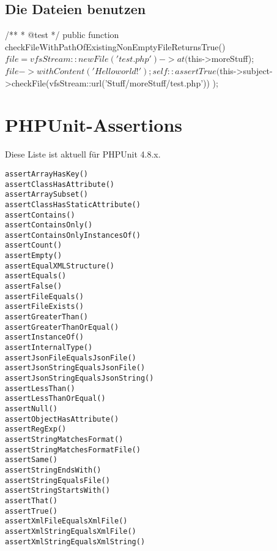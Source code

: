 \documentclass[a4paper,10pt]{scrartcl}
\begin{document}
\subsection{Die Dateien benutzen}
\begin{phpcode}
/**
 * @test
 */
public function checkFileWithPathOfExistingNonEmptyFileReturnsTrue() {
  $file = vfsStream::newFile('test.php')->at($this->moreStuff);
  $file->withContent('Hello world!');

  self::assertTrue(
    $this->subject->checkFile(vfsStream::url('Stuff/moreStuff/test.php'))
  );
}
\end{phpcode}


\section{PHPUnit-Assertions}
Diese Liste ist aktuell für PHPUnit 4.8.x.

\begin{verbatim}
assertArrayHasKey()
assertClassHasAttribute()
assertArraySubset()
assertClassHasStaticAttribute()
assertContains()
assertContainsOnly()
assertContainsOnlyInstancesOf()
assertCount()
assertEmpty()
assertEqualXMLStructure()
assertEquals()
assertFalse()
assertFileEquals()
assertFileExists()
assertGreaterThan()
assertGreaterThanOrEqual()
assertInstanceOf()
assertInternalType()
assertJsonFileEqualsJsonFile()
assertJsonStringEqualsJsonFile()
assertJsonStringEqualsJsonString()
assertLessThan()
assertLessThanOrEqual()
assertNull()
assertObjectHasAttribute()
assertRegExp()
assertStringMatchesFormat()
assertStringMatchesFormatFile()
assertSame()
assertStringEndsWith()
assertStringEqualsFile()
assertStringStartsWith()
assertThat()
assertTrue()
assertXmlFileEqualsXmlFile()
assertXmlStringEqualsXmlFile()
assertXmlStringEqualsXmlString()
\end{verbatim}
\end{document}
